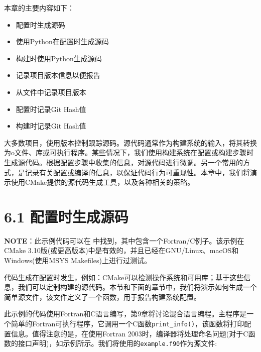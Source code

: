 本章的主要内容如下：

\begin{itemize}
\item 配置时生成源码

\item 使用Python在配置时生成源码

\item 构建时使用Python生成源码

\item 记录项目版本信息以便报告

\item 从文件中记录项目版本

\item 配置时记录Git Hash值

\item 构建时记录Git Hash值

\end{itemize}

大多数项目，使用版本控制跟踪源码。源代码通常作为构建系统的输入，将其转换为o文件、库或可执行程序。某些情况下，我们使用构建系统在配置或构建步骤时生成源代码。根据配置步骤中收集的信息，对源代码进行微调。另一个常用的方式，是记录有关配置或编译的信息，以保证代码行为可重现性。本章中，我们将演示使用CMake提供的源代码生成工具，以及各种相关的策略。


\section{6.1 配置时生成源码}

\begin{myInfoBox}
\textbf{NOTE}：此示例代码可以在  中找到，其中包含一个Fortran/C例子。该示例在CMake 3.10版(或更高版本)中是有效的，并且已经在GNU/Linux、macOS和Windows(使用MSYS Makefiles)上进行过测试。
\end{myInfoBox}

代码生成在配置时发生，例如：CMake可以检测操作系统和可用库；基于这些信息，我们可以定制构建的源代码。本节和下面的章节中，我们将演示如何生成一个简单源文件，该文件定义了一个函数，用于报告构建系统配置。


此示例的代码使用Fortran和C语言编写，第9章将讨论混合语言编程。主程序是一个简单的Fortran可执行程序，它调用一个C函数\texttt{print\_info()}，该函数将打印配置信息。值得注意的是，在使用Fortran 2003时，编译器将处理命名问题(对于C函数的接口声明)，如示例所示。我们将使用的\texttt{example.f90}作为源文件:

